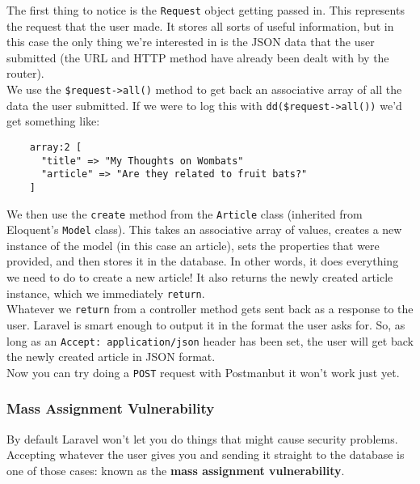 
The first thing to notice is the \texttt{Request} object getting passed in. This represents the request that the user made. It stores all sorts of useful information, but in this case the only thing we're interested in is the JSON data that the user submitted (the URL and HTTP method have already been dealt with by the router).
\\

We use the \texttt{\$request->all()} method to get back an associative array of all the data the user submitted. If we were to log this with \texttt{dd(\$request->all())} we'd get something like:

\begin{verbatim}
    array:2 [
      "title" => "My Thoughts on Wombats"
      "article" => "Are they related to fruit bats?"
    ]
\end{verbatim}

We then use the \texttt{create} method from the \texttt{Article} class (inherited from Eloquent's \texttt{Model} class). This takes an associative array of values, creates a new instance of the model (in this case an article), sets the properties that were provided, and then stores it in the database. In other words, it does everything we need to do to create a new article! It also returns the newly created article instance, which we immediately \texttt{return}.
\\

Whatever we \texttt{return} from a controller method gets sent back as a response to the user. Laravel is smart enough to output it in the format the user asks for. So, as long as an \texttt{Accept: application/json} header has been set, the user will get back the newly created article in JSON format.
\\

Now you can try doing a \texttt{POST} request with Postman\textellipsis{ }but it won't work just yet.


\subsubsection{Mass Assignment Vulnerability}
By default Laravel won't let you do things that might cause security problems. Accepting whatever the user gives you and sending it straight to the database is one of those cases: known as the \textbf{mass assignment vulnerability}.
\\

